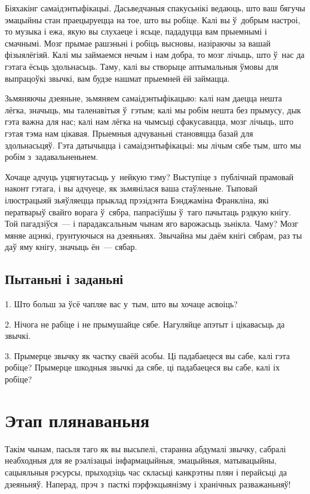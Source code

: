Біяхакінг самаідэнтыфікацыі. Дасьведчаныя спакусьнікі ведаюць, што ваш бягучы эмацыйны стан праецыруецца на тое, што вы робіце. Калі вы ў~добрым настроі, то музыка і ежа, якую вы слухаеце і ясьце, пададуцца вам прыемнымі і смачнымі. Мозг прымае рашэньні і робіць высновы, назіраючы за вашай фізыялёгіяй. Калі мы займаемся нечым і нам добра, то мозг лічыць, што ў~нас да гэтага ёсьць здольнасьць. Таму, калі вы створыце аптымальныя ўмовы для выпрацоўкі звычкі, вам будзе нашмат прыемней ёй займацца.

Зьмяняючы дзеяньне, зьмяняем самаідэнтыфікацыю: калі нам даецца нешта лёгка, значыць, мы таленавітыя ў~гэтым; калі мы робім нешта без прымусу, дык гэта важна для нас; калі нам лёгка на чымсьці сфакусавацца, мозг лічыць, што гэтая тэма нам цікавая. Прыемныя адчуваньні становяцца базай для здольнасьцяў. Гэта датычыцца і самаідэнтыфікацыі: мы лічым сябе тым, што мы робім з~задавальненьнем.

Хочаце адчуць уцягнутасьць у~нейкую тэму? Выступіце з~публічнай прамовай наконт гэтага, і вы адчуеце, як зьмянілася ваша стаўленьне. Тыповай ілюстрацыяй зьяўляецца прыклад прэзідэнта Бэнджаміна Франкліна, які ператварыў свайго ворага ў~сябра, папрасіўшы ў~таго пачытаць рэдкую кнігу. Той пагадзіўся~--- і парадаксальным чынам яго варожасьць зьнікла. Чаму? Мозг мяняе ацэнкі, грунтуючыся на дзеяньнях. Звычайна мы даём кнігі сябрам, раз ты даў яму кнігу, значыць ён~--- сябар.

\subsection*{Пытаньні і заданьні}

1. Што больш за ўсё чапляе вас у~тым, што вы хочаце асвоіць?

2. Нічога не рабіце і не прымушайце сябе. Нагуляйце апэтыт і цікавасьць да звычкі.

3. Прымерце звычку як частку сваёй асобы. Ці падабаецеся вы сабе, калі гэта робіце? Прымерце шкодныя звычкі да сябе, ці падабаецеся вы сабе, калі іх робіце?


\section{Этап плянаваньня}

Такім чынам, пасьля таго як вы высьпелі, старанна абдумалі звычку, сабралі неабходныя для яе рэалізацыі інфармацыйныя, эмацыйныя, матывацыйны, сацыяльныя рэсурсы, прыходзіць час скласьці канкрэтны плян і перайсьці да дзеяньняў. Наперад, прэч з~пасткі пэрфэкцыянізму і хранічных разважаньняў!

